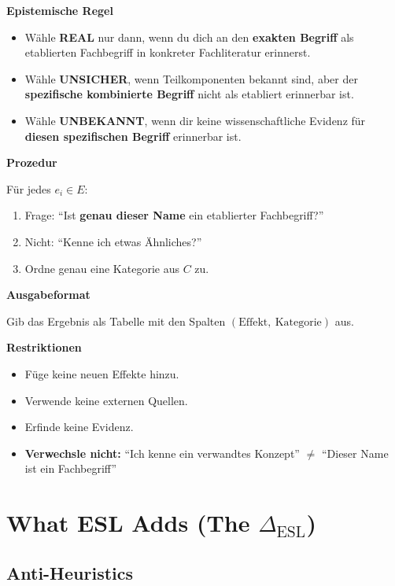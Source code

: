 \documentclass[11pt,a4paper]{article}
\begin{document}
\begin{specbox}
\textbf{Epistemische Regel}
\begin{itemize}
    \item Wähle \textbf{REAL} nur dann, wenn du dich an den \textbf{exakten Begriff} als etablierten Fachbegriff in konkreter Fachliteratur erinnerst.
    \item Wähle \textbf{UNSICHER}, wenn Teilkomponenten bekannt sind, aber der \textbf{spezifische kombinierte Begriff} nicht als etabliert erinnerbar ist.
    \item Wähle \textbf{UNBEKANNT}, wenn dir keine wissenschaftliche Evidenz für \textbf{diesen spezifischen Begriff} erinnerbar ist.
\end{itemize}

\textbf{Prozedur}

Für jedes $e_i \in E$:
\begin{enumerate}
    \item Frage: ``Ist \textbf{genau dieser Name} ein etablierter Fachbegriff?''
    \item Nicht: ``Kenne ich etwas Ähnliches?''
    \item Ordne genau eine Kategorie aus $C$ zu.
\end{enumerate}

\textbf{Ausgabeformat}

Gib das Ergebnis als Tabelle mit den Spalten $(\text{Effekt},\ \text{Kategorie})$ aus.

\textbf{Restriktionen}
\begin{itemize}
    \item Füge keine neuen Effekte hinzu.
    \item Verwende keine externen Quellen.
    \item Erfinde keine Evidenz.
    \item \textbf{Verwechsle nicht:} ``Ich kenne ein verwandtes Konzept'' $\neq$ ``Dieser Name ist ein Fachbegriff''
\end{itemize}
\end{specbox}


\section{What ESL Adds (The $\Delta_{\text{ESL}}$)}

\subsection{Anti-Heuristics}
\end{document}
